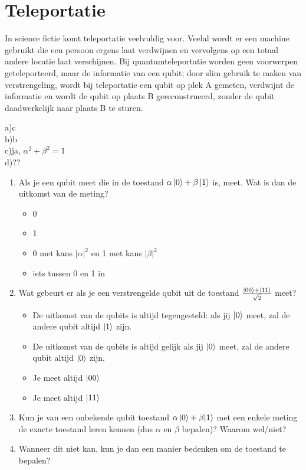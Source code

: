 \documentclass[../../main.tex]{subfiles}
\begin{document}
\section{Teleportatie}
In science fictie komt teleportatie veelvuldig voor. Veelal wordt er een machine gebruikt die een persoon ergens laat verdwijnen en vervolgens op een totaal andere locatie laat verschijnen. Bij quantumteleportatie worden geen voorwerpen geteleporteerd, maar de informatie van een qubit; door slim gebruik te maken van verstrengeling, wordt bij teleportatie een qubit op plek A gemeten, verdwijnt de informatie en wordt de qubit op plaats B gereconstrueerd, zonder de qubit daadwerkelijk naar plaats B te sturen.
\begin{antwoord}
a)c\\
b)b\\
c)ja, $\alpha^2+\beta^2=1$\\
d)??
\end{antwoord}
\begin{enumerate}
\item Als je een qubit meet die in de toestand $\alpha\ket{0}+\beta\ket{1}$ is, meet. Wat is dan de uitkomst van de meting?
\begin{itemize}
\item 0
\item 1
\item 0 met kans $|\alpha|^2$ en 1 met kans $|\beta|^2$ 
\item iets tussen 0 en 1 in
\end{itemize}
\item Wat gebeurt er als je een verstrengelde qubit uit de toestand  $\frac{\ket{00}+\ket{11}}{\sqrt{2}}$ meet?
\begin{itemize}
\item De uitkomst van de qubits is altijd tegengesteld: als jij $\ket{0}$ meet, zal de andere qubit altijd $\ket{1}$ zijn.
\item De uitkomst van de qubits is altijd gelijk als jij $\ket{0}$ meet, zal de andere qubit altijd $\ket{0}$ zijn.
\item Je meet altijd $\ket{00}$
\item Je meet altijd $\ket{11}$
\end{itemize}
\item Kun je van een onbekende qubit toestand $\alpha\ket{0}+\beta{\ket{1}}$ met een enkele meting de exacte toestand leren kennen (dus $\alpha$ en $\beta$ bepalen)? Waarom wel/niet?
\item Wanneer dit niet kan, kun je dan een manier bedenken om de toestand te bepalen?
\end{enumerate}
\end{document}
